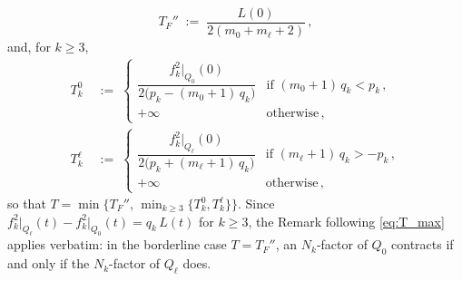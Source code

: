 \documentclass[11pt]{amsart}
\theoremstyle{plain}
\numberwithin{equation}{section}
\theoremstyle{definition}
\theoremstyle{remark}
\begin{document}
\[
T_F'' \;:=\; \frac{L (0)}{2 ( m_0 + m_\ell + 2 )} \,,
\]
and, for $k \geq 3$,
\begin{align*}
T_k^0 & \;:=\; \begin{cases} \dfrac{f_k^2 |_{Q_0} (0)}{2 \big( p_k - ( m_0 + 1 )\, q_k \big)} & \text{if } ( m_0 + 1 )\, q_k < p_k \,, \\[4pt] + \infty & \text{otherwise} \,, \end{cases}\\
T_k^\ell & \;:=\; \begin{cases} \dfrac{f_k^2 |_{Q_\ell} (0)}{2 \big( p_k + ( m_\ell + 1 )\, q_k \big)} & \text{if } ( m_\ell + 1 )\, q_k > - p_k \,, \\[4pt] + \infty & \text{otherwise} \,, \end{cases}
\end{align*}
so that $T = \min \big\{ T_F'' , \, \min_{k \geq 3} \{ T_k^0, T_k^\ell \} \big\}$. Since $f_k^2 \big|_{Q_\ell} (t) - f_k^2 \big|_{Q_0} (t) = q_k\, L (t)$ for $k \geq 3$, the Remark following \eqref{eq:T_max} applies verbatim: in the borderline case $T = T_F''$, an $N_k$-factor of $Q_0$ contracts if and only if the $N_k$-factor of $Q_\ell$ does.
\end{document}
